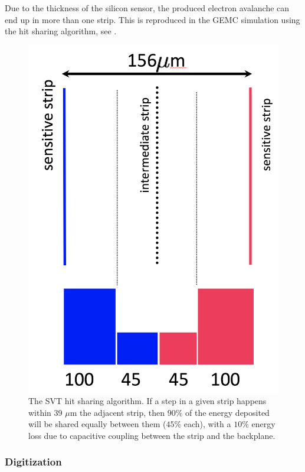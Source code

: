 Due to the thickness of the silicon sensor, the produced electron avalanche can end up in more than one strip. This
is reproduced in the GEMC simulation using the hit sharing algorithm, see .

\begin{figure}[t]
	\centering
	\includegraphics[width=0.99\columnwidth,keepaspectratio]{img/bstHitSharing.png}
	\caption{The SVT hit sharing algorithm. If a step in a given strip happens within 39 $\mu$m the adjacent strip, then
             $90\%$ of the energy deposited will be shared equally between them ($45\%$ each), with a $10\%$ energy loss due
	         to capacitive coupling between the strip and the backplane.}
	\label{fig:bstHitSharing}
\end{figure}


\subsubsection{Digitization}

